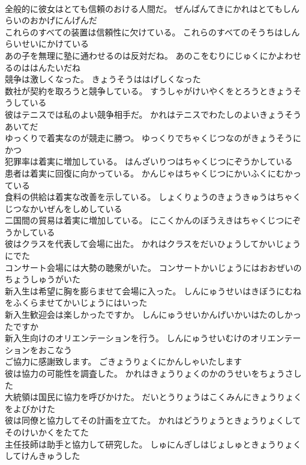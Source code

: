 \documentclass[8pt]{extreport}
\begin{document}
\begin{CJK}{UTF8}{min}
\\	全般的に彼女はとても信頼のおける人間だ。	ぜんぱんてきにかれはとてもしんらいのおかげにんげんだ 
\\	これらのすべての装置は信頼性に欠けている。	これらのすべてのそうちはしんらいせいにかけている 
\\	あの子を無理に塾に通わせるのは反対だね。	あのこをむりにじゅくにかよわせるのははんたいだね 
\\	競争は激しくなった。	きょうそうははげしくなった 
\\	数社が契約を取ろうと競争している。	すうしゃがけいやくをとろうときょうそうしている 
\\	彼はテニスでは私のよい競争相手だ。	かれはテニスでわたしのよいきょうそうあいてだ 
\\	ゆっくりで着実なのが競走に勝つ。	ゆっくりでちゃくじつなのがきょうそうにかつ 
\\	犯罪率は着実に増加している。	はんざいりつはちゃくじつにぞうかしている 
\\	患者は着実に回復に向かっている。	かんじゃはちゃくじつにかいふくにむかっている 
\\	食料の供給は着実な改善を示している。	しょくりょうのきょうきゅうはちゃくじつなかいぜんをしめしている 
\\	二国間の貿易は着実に増加している。	にこくかんのぼうえきはちゃくじつにぞうかしている 
\\	彼はクラスを代表して会場に出た。	かれはクラスをだいひょうしてかいじょうにでた 
\\	コンサート会場には大勢の聴衆がいた。	コンサートかいじょうにはおおぜいのちょうしゅうがいた 
\\	新入生は希望に胸を膨らませて会場に入った。	しんにゅうせいはきぼうにむねをふくらませてかいじょうにはいった 
\\	新入生歓迎会は楽しかったですか。	しんにゅうせいかんげいかいはたのしかったですか 
\\	新入生向けのオリエンテーションを行う。	しんにゅうせいむけのオリエンテーションをおこなう 
\\	ご協力に感謝致します。	ごきょうりょくにかんしゃいたします 
\\	彼は協力の可能性を調査した。	かれはきょうりょくのかのうせいをちょうさした 
\\	大統領は国民に協力を呼びかけた。	だいとうりょうはこくみんにきょうりょくをよびかけた 
\\	彼は同僚と協力してその計画を立てた。	かれはどうりょうときょうりょくしてそのけいかくをたてた 
\\	主任技師は助手と協力して研究した。	しゅにんぎしはじょしゅときょうりょくしてけんきゅうした 

\end{CJK}
\end{document}
